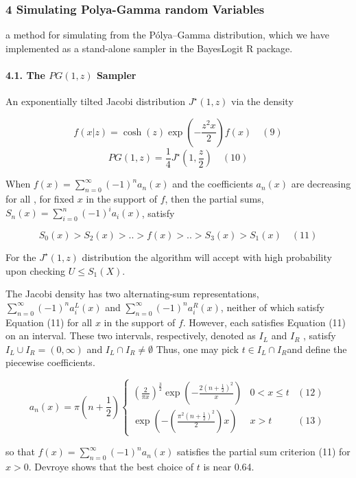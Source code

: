 \documentclass[
]{article}
\begin{document}
\hypertarget{simulating-polya-gamma-random-variables}{%
\subsubsection{4 Simulating Polya-Gamma random
Variables}\label{simulating-polya-gamma-random-variables}}

a method for simulating from the Pólya--Gamma distribution, which we
have implemented as a stand-alone sampler in the BayesLogit R package.

\hypertarget{the-pg1z-sampler}{%
\paragraph{\texorpdfstring{4.1. The \(PG(1,z)\)
Sampler}{4.1. The PG(1,z) Sampler}}\label{the-pg1z-sampler}}

An exponentially tilted Jacobi distribution \(J^\star(1,z)\) via the
density

\[f(x|z)=\cosh(z)\exp\left(-\frac{z^{2}x}2\right)f(x)\quad(9)\]
\[PG(1,z)=\frac14J^\star(1,\frac z2)\quad (10)\]

When \(f(x)=\sum_{n=0}^\infty(-1)^na_n(x)\) and the coefficients
\(a_n(x)\) are decreasing for all , for fixed \(x\) in the support of
\(f\), then the partial sums, \(S_n(x)=\sum_{i=0}^n(-1)^ia_i(x)\),
satisfy

\[S_0(x)>S_2(x)>..>f(x)>..>S_3(x)>S_1(x)\quad (11)\]

For the \(J^\star(1,z)\) distribution the algorithm will accept with
high probability upon checking \(U\le S_1(X)\).

The Jacobi density has two alternating-sum representations,
\(\sum_{n=0}^\infty(-1)^na_i^L(x)\) and
\(\sum_{n=0}^\infty(-1)^na_i^R(x)\), neither of which satisfy Equation
(11) for all \(x\) in the support of \(f\). However, each satisfies
Equation (11) on an interval. These two intervals, respectively, denoted
as \(I_L\) and \(I_R\) , satisfy \(I_L\cup I_R = (0,\infty)\) and
\(I_L\cap I_R\neq\emptyset\) Thus, one may pick \(t\in I_L\cap I_R\)and
define the piecewise coefficients.

\[a_n(x)=\pi(n+\frac{1}2)\begin{cases}(\frac{2}{\pi x})^{\frac32}\exp\left(-\frac{2(n+\frac{1}2)^2}{x}\right) & 0<x\le t&(12)\\ \exp\left(-(\frac{\pi^2(n+\frac{1}2)^{2}}2)x\right) & x>t&(13)\end{cases}\]

so that \(f(x)=\sum_{n=0}^\infty(-1)^na_n(x)\) satisfies the partial sum
criterion (11) for \(x>0\). Devroye shows that the best choice of \(t\)
is near 0.64.
\end{document}
